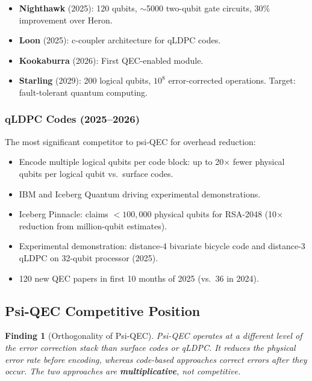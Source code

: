 \documentclass[11pt]{article}
\newtheorem{finding}[theorem]{Finding}
\theoremstyle{definition}
\theoremstyle{remark}
\begin{document}
\begin{itemize}[nosep]
\item \textbf{Nighthawk} (2025): 120 qubits, $\sim$5000 two-qubit gate
  circuits, 30\% improvement over Heron.
\item \textbf{Loon} (2025): c-coupler architecture for qLDPC codes.
\item \textbf{Kookaburra} (2026): First QEC-enabled module.
\item \textbf{Starling} (2029): 200 logical qubits, $10^8$ error-corrected
  operations. Target: fault-tolerant quantum computing.
\end{itemize}

\subsubsection{qLDPC Codes (2025--2026)}

The most significant competitor to psi-QEC for overhead reduction:
\begin{itemize}[nosep]
\item Encode multiple logical qubits per code block: up to 20$\times$
  fewer physical qubits per logical qubit vs.\ surface codes.
\item IBM and Iceberg Quantum driving experimental demonstrations.
\item Iceberg Pinnacle: claims $< 100{,}000$ physical qubits for
  RSA-2048 (10$\times$ reduction from million-qubit estimates).
\item Experimental demonstration: distance-4 bivariate bicycle code and
  distance-3 qLDPC on 32-qubit processor (2025).
\item 120 new QEC papers in first 10 months of 2025 (vs.\ 36 in 2024).
\end{itemize}

\subsection{Psi-QEC Competitive Position}

\begin{finding}[Orthogonality of Psi-QEC]
Psi-QEC operates at a different level of the error correction stack
than surface codes or qLDPC. It reduces the \emph{physical} error
rate before encoding, whereas code-based approaches correct errors
\emph{after} they occur. The two approaches are \textbf{multiplicative},
not competitive.
\end{finding}
\end{document}
